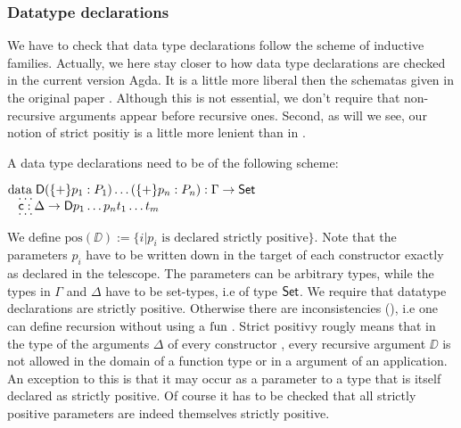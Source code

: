 \subsubsection{Datatype declarations}
We have to check that data type declarations follow the scheme of inductive families.
Actually, we here stay closer to how data type declarations are checked in the current version Agda.
It is a little more liberal then the schematas given in the original paper \cite{dubjier}.
Although this is not essential, we don't require that non-recursive arguments appear before recursive ones.
Second, as will we see, our notion of strict positiy is a little more lenient than in \cite{dubjier}.

A data type declarations need to be of the following scheme:
\begin{bsp}
$\mathrm{data}\; \mathsf{D} ( \{+\} p_1 : P_1) \ldots ( \{+\} p_n : P_n) : \Gamma \rightarrow \mathsf{Set} $\\
$\hspace*{3mm} \ldots$\\
$\hspace*{3mm} \mathsf{c} : \Delta \rightarrow \mathsf{D} p_1 \ldots p_n t_1 \ldots t_m$\\
$\hspace*{3mm} \ldots$\\   
\end{bsp}

\newcommand{\pos}{\mbox{pos}}
We define $\pos(\DD) := \{ i \vert p_i \mbox{ is declared strictly positive} \}. $ 
Note that the parameters $p_i$ have to be written down in the target of each constructor exactly as declared in the telescope.  
The parameters can be arbitrary types, while the types in $\Gamma$ and $\Delta$ have to be set-types, i.e of type $\mathsf{Set}$.
We require that datatype declarations are strictly positive.
Otherwise there are inconsistencies (\cite{paulinmohring93inductive}), i.e one can define recursion without using a $\mathrm{fun}\;$.
Strict positivy rougly means that in the type of the arguments $\Delta$ of every constructor , every recursive argument $\DD$ is not allowed in the domain of a function type or in a argument of an application.
An exception to this is that it may occur as a parameter to a type that is itself declared as strictly positive.
Of course it has to be checked that all strictly positive parameters are indeed themselves strictly positive.

\newcommand{\sposc}[3]{#1\vdash#2\mbox{ \textbf{sposc} }#3}
\newcommand{\spos}[3]{#1\vdash#2\mbox{ \textbf{spos} }#3}

